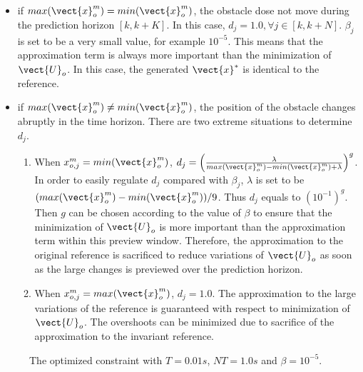 \begin{itemize}

\item if $max(\vect{x}_o^{m})=min(\vect{x}_o^{m})$, the obstacle dose not move during the prediction horizon $[k, k+K]$. In this case, $d_j = 1.0, \forall j \in [k, k+N]$. $\beta_j$ is set to be a very small value, for example $10^{-5}$. This means that the approximation term is always more important than the minimization of $\vect{U}_o$. In this case, the generated $\vect{x}^*$ is identical to the reference.

\item if $max(\vect{x}_o^{m}) \neq min(\vect{x}_o^{m})$, the position of the obstacle changes abruptly in the time horizon. There are two extreme situations to determine $d_j$. 
\begin{enumerate}[1)]

\item When $x_{o,j}^{m} = min(\vect{x}_o^{m})$, $d_j = \left(\frac{\lambda}{max(\vect{x}_o^{m})-min(\vect{x}_o^{m})+\lambda}\right)^g$. In order to easily regulate $d_j$ compared with $\beta_j$, $\lambda$ is set to be $(max(\vect{x}_o^{m})-min(\vect{x}_o^{m}))/9$. Thus $d_j$ equals to $\left(10^{-1}\right)^g$. Then $g$ can be chosen according to the value of $\beta$ to ensure that the minimization of $\vect{U}_o$ is more important than the approximation term within this preview window. Therefore, the approximation to the original reference is sacrificed to reduce variations of $\vect{U}_o$ as soon as the large changes is previewed over the prediction horizon.


\item When $x_{o,j}^{m} = max(\vect{x}_o^{m})$, $d_j = 1.0$. The approximation to the large variations of the reference is guaranteed with respect to minimization of $\vect{U}_o$. The overshoots can be minimized due to sacrifice of the approximation to the invariant reference.
\end{enumerate}
\end{itemize}

\begin{figure}[!htb]
\centering
{} \quad
{} \quad
{}\quad
\caption{The optimized constraint with $T=0.01s$, $NT=1.0s$ and $\beta=10^{-5}$.}
\label{fig:MPC dynamic weighting}
\end{figure}

